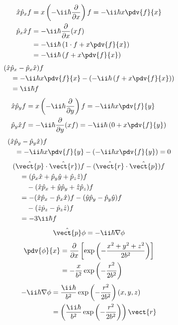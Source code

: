 \begin{align*}
\hat{x}\hat{p}_{x}f&=x\left(-\ii\hbar\frac{\partial}{\partial x}\right)f=-\ii\hbar x\pdv{f}{x}\\
\hat{p}_{x}\hat{x}f&=-\ii\hbar\frac{\partial}{\partial x}(xf)\\
&=-\ii\hbar\left(1\cdot f+x\pdv{f}{x}\right)\\
&=-\ii\hbar\left(f+x\pdv{f}{x}\right)
\end{align*}
\begin{align*}
&(\hat{x}\hat{p}_{x}-\hat{p}_{x}\hat{x})f\\
&\quad=-\ii\hbar x\pdv{f}{x}-\left(-\ii\hbar\left(f+x\pdv{f}{x}\right)\right)\\
&\quad=\ii\hbar f
\end{align*}
\begin{align*}
\hat{x}\hat{p}_{y}f&=x\left(-\ii\hbar\frac{\partial}{\partial y}\right)f=-\ii\hbar x\pdv{f}{y}\\
\hat{p}_{y}\hat{x}f&=-\ii\hbar\frac{\partial}{\partial y}(xf)=-\ii\hbar\left(0+x\pdv{f}{y}\right)
\end{align*}
\begin{align*}
&(\hat{x}\hat{p}_{y}-\hat{p}_{y}\hat{x})f\\
&\quad=-\ii\hbar x\pdv{f}{y}-\left(-\ii\hbar x\pdv{f}{y}\right)=0
\end{align*}
\begin{align*}
&(\hat{\vect{p}}\cdot\hat{\vect{r}})f-(\hat{\vect{r}}\cdot\hat{\vect{p}})f\\
&\quad=(\hat{p}_{x}\hat{x}+\hat{p}_{y}\hat{y}+\hat{p}_{z}\hat{z})f\\
&\qquad-(\hat{x}\hat{p}_{x}+\hat{y}\hat{p}_{y}+\hat{z}\hat{p}_{z})f\\
&\quad=-(\hat{x}\hat{p}_{x}-\hat{p}_{x}\hat{x})f-(\hat{y}\hat{p}_{y}-\hat{p}_{y}\hat{y})f\\
&\qquad-(\hat{z}\hat{p}_{z}-\hat{p}_{z}\hat{z})f\\
&\quad=-3\ii\hbar f
\end{align*}
\[ \hat{\vect{p}}\phi=-\ii\hbar\nabla\phi \]
\begin{align*}
\pdv{\phi}{x}&=\frac{\partial}{\partial x}\left[\exp\left(-\frac{x^{2}+y^{2}+z^{2}}{2b^{2}}\right)\right]\\
&=-\frac{x}{b^{2}}\exp\left(-\frac{r^{2}}{2b^{2}}\right)
\end{align*}
\begin{align*}
-\ii\hbar\nabla\phi&=\frac{\ii\hbar}{b^{2}}\exp\left(-\frac{r^{2}}{2b^{2}}\right)(x,y,z)\\
&=\left(\frac{\ii\hbar}{b^{2}}\exp\left(-\frac{r^{2}}{2b^{2}}\right)\right)\vect{r}
\end{align*}
